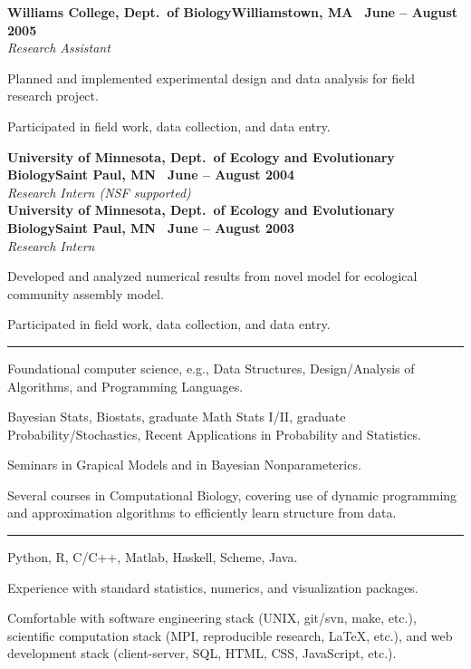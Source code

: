 \documentclass{article}
\newcommand{\ressection}[1]{\noindent{\large\textbf{#1}}\vspace{2pt}\hrule\vspace{4pt}}
\newcommand{\leftandright}[2]{\noindent\textbf{#1}\hfill\textbf{#2}}
\begin{document}
\leftandright{Williams College, Dept.\ of Biology}{Williamstown, MA
  \textbullet\, June -- August 2005} \\
\textit{Research Assistant}

\begin{itemize*}
\item Planned and implemented experimental design and data analysis
  for field research project.
\item Participated in field work, data collection, and data entry.
\end{itemize*}

\leftandright{University of Minnesota, Dept.\ of Ecology and
  Evolutionary Biology}{Saint Paul, MN \textbullet\, June -- August
  2004} \\
\textit{Research Intern (NSF supported)} \\
\leftandright{University of Minnesota, Dept.\ of Ecology and
  Evolutionary Biology}{Saint Paul, MN \textbullet\, June -- August
  2003} \\
\textit{Research Intern}

\begin{itemize*}
\item Developed and analyzed numerical results from novel model for ecological
  community assembly model.
\item Participated in field work, data collection, and data entry.
\end{itemize*}

\vspace{1.0em}

\ressection{Relevant coursework}

\begin{itemize*}
\item Foundational computer science, e.g., Data Structures,
  Design/Analysis of Algorithms, and Programming Languages.
\item Bayesian Stats, Biostats, graduate Math Stats I/II, graduate
  Probability/Stochastics, Recent Applications in Probability and Statistics.
\item Seminars in Grapical Models and in Bayesian Nonparameterics.
\item Several courses in Computational Biology, covering use of
  dynamic programming and approximation algorithms to efficiently
  learn structure from data.
\end{itemize*}

\vspace{1.0em}

\ressection{Programming}

\begin{itemize*}
\item Python, R, C/C++, Matlab, Haskell, Scheme, Java.
\item Experience with standard statistics, numerics, and
  visualization packages.
\item Comfortable with software engineering stack (UNIX, git/svn,
  make, etc.), scientific computation stack (MPI, reproducible
  research, \LaTeX, etc.), and web development stack (client-server,
  SQL, HTML, CSS, JavaScript, etc.).
\end{itemize*}
\end{document}

